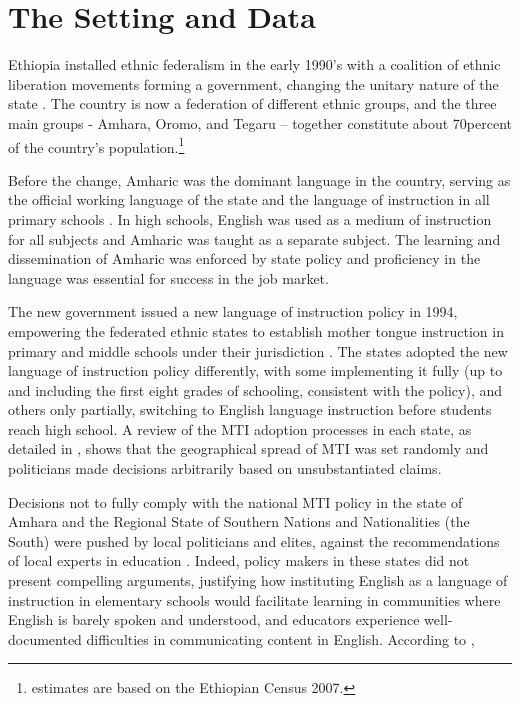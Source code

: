 
\section{The Setting and Data}
\label{section:data}

Ethiopia installed ethnic federalism in the early 1990's with a coalition of ethnic liberation movements forming a government, changing the unitary nature of the state \citep{Henze1992}. The country is now a federation of different ethnic groups, and the three main groups - Amhara, Oromo, and Tegaru – together constitute about 70percent of the country’s population.\footnote{ estimates are based on the Ethiopian Census 2007.} 

Before the change, Amharic was the dominant language in the country, serving as the official working language of the state and the language of instruction in all primary schools \citep{Heugh2007}. In high schools, English was used as a medium of instruction for all subjects and Amharic was taught as a separate subject. The learning and dissemination of Amharic was enforced by state policy and proficiency in the language was essential for success in the job market.

The new government issued a new language of instruction policy in 1994, empowering the federated ethnic states to establish mother tongue instruction in primary and middle schools under their jurisdiction \citep{Heugh2007}. The states adopted the new language of instruction policy differently, with some implementing it fully (up to and including the first eight grades of schooling, consistent with the policy), and others only partially, switching to English language instruction before students reach high school. A review of the MTI adoption processes in each state, as detailed in \citet{Heugh2007}, shows that the geographical spread of MTI was set randomly and politicians made decisions arbitrarily based on unsubstantiated claims.

Decisions not to fully comply with the national MTI policy in the state of Amhara and the Regional State of Southern Nations and Nationalities (the South) were pushed by local politicians and elites, against the recommendations of local experts in education \citep{Heugh2007}. Indeed, policy makers in these states did not present compelling arguments, justifying how instituting English as a language of instruction in elementary schools would facilitate learning in communities where English is barely spoken and understood, and educators experience well-documented difficulties in communicating content in English. According to \citep{Heugh2007},

